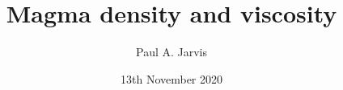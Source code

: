 \documentclass{beamer}
\title[Modeling volcanic processes]{Magma density and viscosity} %
\author[Paul Jarvis]{Paul A. Jarvis} %
\institute[UNIGE] %
{
\textit{paul.jarvis@unige.ch} %
}
\date{13th November 2020} %
\begin{document}
\begin{frame}
\titlepage %
\end{frame}





\end{document}
